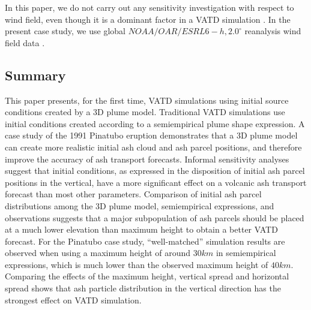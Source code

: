\documentclass[utf8]{frontiersSCNS} %
\begin{document}
In this paper, we do not carry out any sensitivity investigation with respect to wind field, even though it is a dominant factor in a VATD simulation \citep{stefanescu2014fast}. In the present case study, we use global $NOAA/OAR/ESRL 6-h, 2.0^{\circ}$ reanalysis wind field data \citep{whitaker2004reanalysis, compo2006feasibility, compo2011twentieth}.

\subsection{Summary}

This paper presents, for the first time, VATD simulations using initial source conditions created by a 3D plume model. Traditional VATD simulations use initial conditions created according to a semiempirical plume shape expression. A case study of the 1991 Pinatubo eruption demonstrates that a 3D plume model can create more realistic initial ash cloud and ash parcel positions, and therefore improve the accuracy of ash transport forecasts. Informal sensitivity analyses suggest that initial conditions, as expressed in the disposition of initial ash parcel positions in the vertical, have a more significant effect on a volcanic ash transport forecast than most other parameters. Comparison of initial ash parcel distributions among the 3D plume model, semiempirical expressions, and observations suggests that a major subpopulation of ash parcels should be placed at a much lower elevation than maximum height to obtain a better VATD forecast. For the Pinatubo case study, ``well-matched'' simulation results are observed when using a maximum height of around $30 km$ in semiempirical expressions, which is much lower than the observed maximum height of $40 km$. Comparing the effects of the maximum height, vertical spread and horizontal spread shows that ash particle distribution in the vertical direction has the strongest effect on VATD simulation.
\end{document}
